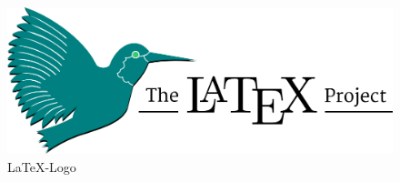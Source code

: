 \begin{figure}[H]
	\centering
	\includegraphics[width=\textwidth]{exercises/graphics/latex-logo.png}
	\caption{\LaTeX{}-Logo}
\end{figure}